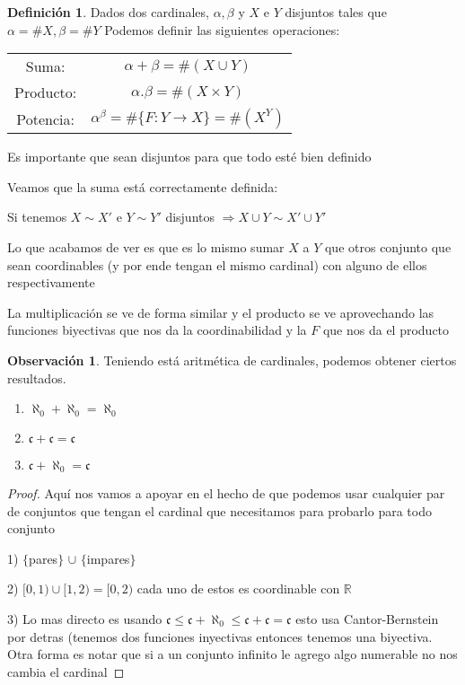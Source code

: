 \documentclass[12pt]{article}
\newcommand{\n}{\aleph_{0}}
\newcommand{\R}{\mathbb{R}}
\newcommand{\Ra}{\Rightarrow}
\newcommand{\ra}{\rightarrow}
\theoremstyle{definition}
\newtheorem{definition}{Definición}[section]
\newtheorem*{remark}{Observación}
\begin{document}
\begin{definition}
  Dados dos cardinales, $\alpha, \beta$ y $X$ e $Y$ disjuntos tales que $\alpha = \# X, \beta = \# Y$ 
Podemos definir las siguientes operaciones:

\begin{center}
\begin{tabular}{ c c  }
  Suma: & $\alpha + \beta = \# (X \cup Y)$  \\ 
  Producto: & $\alpha . \beta = \# (X \times Y)$  \\  
  Potencia: & $\alpha^{\beta} = \# \{F: Y \ra X\} = \#(X^Y)$     
\end{tabular}
\end{center}


Es importante que sean disjuntos para que todo esté bien definido

Veamos que la suma está correctamente definida:

Si tenemos $X \sim X'$ e $Y \sim Y'$ disjuntos $\Ra X \cup Y \sim X' \cup Y'$ 

Lo que acabamos de ver es que es lo mismo sumar $X$ a $Y$ que otros conjunto que sean coordinables (y por ende tengan el mismo cardinal) con alguno de ellos respectivamente

La multiplicación se ve de forma similar y el producto se ve aprovechando las funciones biyectivas que nos da la coordinabilidad y la $F$ que nos da el producto
\end{definition}

\begin{remark}
  Teniendo está aritmética de cardinales, podemos obtener ciertos resultados.

 \begin{enumerate}
      \item $\n + \n = \n$   
      \item $\mathfrak{c} + \mathfrak{c} = \mathfrak{c}$ 
      \item$ \mathfrak{c} + \n = \mathfrak{c}$
      \end{enumerate}
      
  \begin{proof}
    Aquí nos vamos a apoyar en el hecho de que podemos usar cualquier par de conjuntos que tengan el cardinal que necesitamos para probarlo para todo conjunto

  1) $\{$pares$\}$ $\cup$ $\{$impares$\}$

2) $[0,1) \cup [1,2) = [0,2)$ cada uno de estos es coordinable con $\R$

3) Lo mas directo es usando $\mathfrak{c} \leq \mathfrak{c} + \n \leq \mathfrak{c} + \mathfrak{c} = \mathfrak{c}$ esto usa Cantor-Bernstein por detras (tenemos dos funciones inyectivas entonces tenemos una biyectiva. Otra forma es notar que si a un conjunto infinito le agrego algo numerable no nos cambia el cardinal
    
  \end{proof}

\end{remark}
\end{document}
